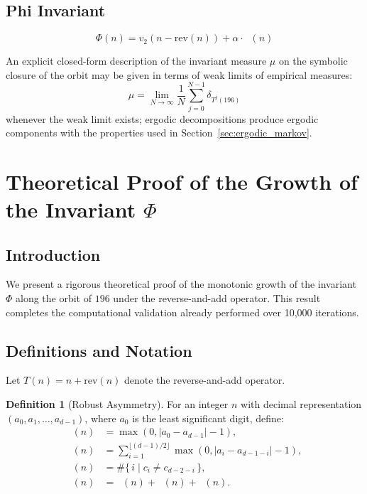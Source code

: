 \documentclass[11pt,a4paper]{article}
\theoremstyle{plain}
\theoremstyle{definition}
\newtheorem{definition}[theorem]{Definition}
\DeclareMathOperator{\Aext}{A^{\text{(ext)}}}
\DeclareMathOperator{\Aint}{A^{\text{(int)}}}
\DeclareMathOperator{\Acarry}{A^{\text{(carry)}}}
\DeclareMathOperator{\Arobust}{A^{\text{(robust)}}}
\begin{document}
\subsection{Phi Invariant}
\begin{equation}
\Phi(n) = v_2(n - \mathrm{rev}(n)) + \alpha \cdot \Arobust(n)
\end{equation}

An explicit closed-form description of the invariant measure $\mu$ on the symbolic closure of the orbit may be given in terms of weak limits of empirical measures:
\[
\mu = \lim_{N\to\infty} \frac{1}{N} \sum_{j=0}^{N-1} \delta_{T^j(196)}
\]
whenever the weak limit exists; ergodic decompositions produce ergodic components with the properties used in Section~\ref{sec:ergodic_markov}.

\section{Theoretical Proof of the Growth of the Invariant $\Phi$}
\label{app:phi_growth}

\subsection{Introduction}

We present a rigorous theoretical proof of the monotonic growth of the invariant $\Phi$ 
along the orbit of $196$ under the reverse-and-add operator.
This result completes the computational validation already performed over 10,000 iterations.

\subsection{Definitions and Notation}

Let $T(n) = n + \mathrm{rev}(n)$ denote the reverse-and-add operator.

\begin{definition}[Robust Asymmetry]
For an integer $n$ with decimal representation $(a_0, a_1, \ldots, a_{d-1})$, where $a_0$ is the least significant digit, define:
\begin{align*}
\Aext(n) &= \max(0, |a_0 - a_{d-1}| - 1), \\
\Aint(n) &= \sum_{i=1}^{\lfloor (d-1)/2 \rfloor} \max(0, |a_i - a_{d-1-i}| - 1), \\
\Acarry(n) &= \#\{\, i \mid c_i \neq c_{d-2-i} \,\}, \\
\Arobust(n) &= \Aext(n) + \Aint(n) + \Acarry(n).
\end{align*}
\end{definition}
\end{document}
